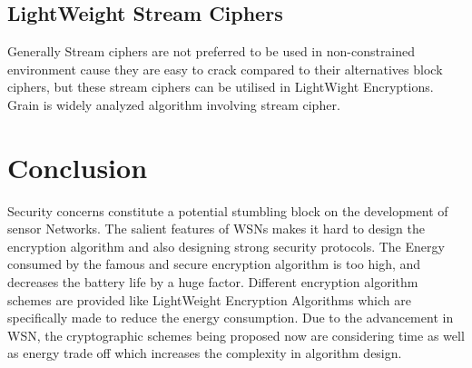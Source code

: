 \documentclass[conference]{IEEEtran}
\begin{document}
\subsection{LightWeight Stream Ciphers}
Generally Stream ciphers are not preferred to be used in non-constrained environment cause they are easy to crack compared to their alternatives block ciphers, but these stream ciphers can be utilised in LightWight Encryptions. Grain is widely analyzed algorithm involving stream cipher.

\section{Conclusion}
\begin{flushleft}
Security concerns constitute a potential stumbling block on the development of sensor Networks. The salient features of WSNs makes it hard to design the encryption algorithm and also designing strong security protocols. The Energy consumed by the famous and secure encryption algorithm is too high, and decreases the battery life by a huge factor. Different encryption algorithm schemes are provided like LightWeight Encryption Algorithms which are specifically made to reduce the energy consumption. Due to the advancement in WSN, the cryptographic schemes being proposed now are considering time as well as energy trade off which increases the complexity in algorithm design.
\end{flushleft}

\ifCLASSOPTIONcaptionsoff
  \newpage
\fi
\end{document}
